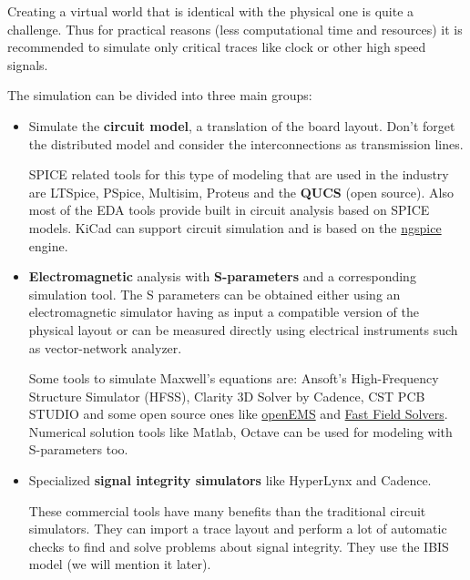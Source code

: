 \documentclass[final]{cubedoc}
\begin{document}
	Creating a virtual world that is identical with the physical one is quite a challenge. Thus for practical reasons (less computational time and resources) it is recommended to simulate only critical traces like clock or other high speed signals.
	
	The simulation can be divided into three main groups: 
	
	\begin{itemize}
		\item Simulate the \textbf{circuit model}, a translation of the board layout. 
		Don't forget the distributed model and consider the interconnections as transmission lines.
		
		SPICE related tools for this type of modeling that are used in the industry are LTSpice, PSpice, Multisim, Proteus and the \textbf{QUCS} (open source). Also most of the EDA tools provide built in circuit analysis based on SPICE models. KiCad can support circuit simulation and is based on the \href{http://ngspice.sourceforge.net/ngspice-eeschema.html}{ngspice} engine.
		
		
		\item \textbf{Electromagnetic} analysis with \textbf{S-parameters} and a corresponding simulation tool. The S parameters can be obtained either using an electromagnetic simulator having as input a compatible version of the physical layout or can be measured directly using electrical instruments such as vector-network analyzer. 
		
		Some tools to simulate Maxwell's equations are: Ansoft’s High-Frequency Structure Simulator (HFSS), Clarity 3D Solver by Cadence, CST PCB STUDIO and some open source ones like \href{https://www.opensourceimaging.org/project/open-ems-a-free-and-open-electromagnetic-field-solver/}{openEMS} and \href{https://www.fastfieldsolvers.com/}{Fast Field Solvers}.
		Numerical solution tools like Matlab, Octave can be used for modeling with S-parameters too.
		
		\item Specialized \textbf{signal integrity simulators} like HyperLynx and Cadence.
		
		These commercial tools have many benefits than the traditional circuit simulators. They can import a trace layout and perform a lot of automatic checks to find and solve problems about signal integrity. They use the IBIS model (we will mention it later).
	\end{itemize}
	
\end{document}
